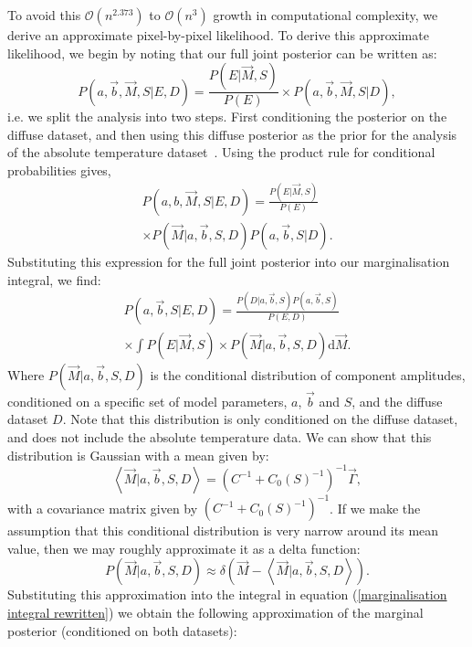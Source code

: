 \documentclass[fleqn,usenatbib]{mnras}
\begin{document}
To avoid this $\mathcal{O}(n^{2.373})$ to $\mathcal{O}(n^{3})$ growth in computational complexity, we derive an approximate pixel-by-pixel likelihood. To derive this approximate likelihood, we begin by noting that our full joint posterior can be written as:
\begin{equation}
    P(a,\Vec{b},\Vec{M},S|E,D) =\frac{P(E| \Vec{M},S)}{P(E)} \times P(a,\Vec{b},\vec{M},S|D),
\end{equation}
i.e. we split the analysis into two steps. First conditioning the posterior on the diffuse dataset, and then using this diffuse posterior as the prior for the analysis of the absolute temperature dataset~\citep{Sivia_Skilling}. Using the product rule for conditional probabilities gives,
\begin{multline}\label{rewritten joint posterior}
    P(a,b,\Vec{M},S|E,D) = \frac{P(E| \Vec{M},S)}{P(E)} \\ \times P(\Vec{M}|a,\Vec{b},S, D) P(a,\Vec{b},S|D).
\end{multline}
Substituting this expression for the full joint posterior into our marginalisation integral, we find:
\begin{multline}\label{marginalisation integral rewritten}
    P(a,\Vec{b},S|E,D) = \frac{P(D|a,\Vec{b},S)P(a,\Vec{b},S)}{P(E,D)} \\ \times \int P(E|\Vec{M},S) \times P(\Vec{M}|a,\Vec{b},S, D) \mathrm{d}\Vec{M}.
\end{multline}
Where $P(\Vec{M}|a,\Vec{b},S, D)$ is the conditional distribution of component amplitudes, conditioned on a specific set of model parameters, $a$, $\Vec{b}$ and $S$, and the diffuse dataset $D$. Note that this distribution is only conditioned on the diffuse dataset, and does not include the absolute temperature data. We can show that this distribution is Gaussian with a mean given by:
\begin{equation}\label{mean maps}
    \left<\Vec{M}|a,\Vec{b},S,D\right> = (C^{-1} + C_0(S)^{-1})^{-1}\Vec{\Gamma},
\end{equation}
with a covariance matrix given by $(C^{-1} + C_0(S)^{-1})^{-1}$. If we make the assumption that this conditional distribution is very narrow around its mean value, then we may roughly approximate it as a delta function:
\begin{equation}
    P(\Vec{M}|a,\Vec{b},S, D) \approx \delta\left(\Vec{M} - \left<\Vec{M}|a,\Vec{b},S,D\right>\right).
\end{equation}
Substituting this approximation into the integral in equation (\ref{marginalisation integral rewritten}) we obtain the following approximation of the marginal posterior (conditioned on both datasets):
\end{document}
